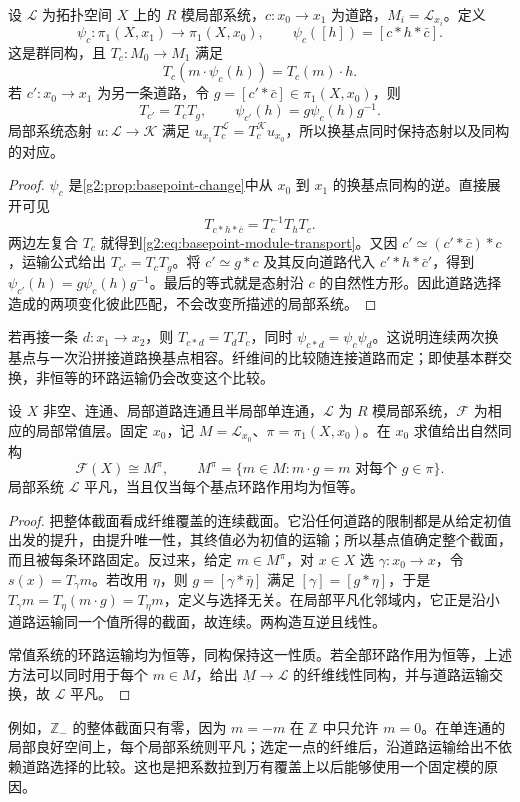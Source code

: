 \begin{proposition}\label{g2:prop:basepoint-local-system}
	设 \(\mathcal L\) 为拓扑空间 \(X\) 上的 \(R\) 模局部系统，\(c:x_0\to x_1\) 为道路，\(M_i=\mathcal L_{x_i}\)。定义
	\[
		\psi_c:\pi_1(X,x_1)\longrightarrow\pi_1(X,x_0),\qquad
		\psi_c([h])=[c*h*\bar c].
	\]
	这是群同构，且 \(T_c:M_0\to M_1\) 满足
	\begin{equation}\label{g2:eq:basepoint-module-transport}
		T_c(m\cdot\psi_c(h))=T_c(m)\cdot h.
	\end{equation}
	若 \(c':x_0\to x_1\) 为另一条道路，令 \(g=[c'*\bar c]\in\pi_1(X,x_0)\)，则
	\[
		T_{c'}=T_cT_g,\qquad\psi_{c'}(h)=g\psi_c(h)g^{-1}.
	\]
	局部系统态射 \(u:\mathcal L\to\mathcal K\) 满足 \(u_{x_1}T_c^{\mathcal L}=T_c^{\mathcal K}u_{x_0}\)，所以换基点同时保持态射以及同构的对应。
\end{proposition}
\begin{proof}
	\(\psi_c\) 是\cref{g2:prop:basepoint-change}中从 \(x_0\) 到 \(x_1\) 的换基点同构的逆。直接展开可见
	\[
		T_{c*h*\bar c}=T_c^{-1}T_hT_c.
	\]
	两边左复合 \(T_c\) 就得到\eqref{g2:eq:basepoint-module-transport}。又因 \(c'\simeq(c'*\bar c)*c\)，运输公式给出 \(T_{c'}=T_cT_g\)。将 \(c'\simeq g*c\) 及其反向道路代入 \(c'*h*\bar c'\)，得到 \(\psi_{c'}(h)=g\psi_c(h)g^{-1}\)。最后的等式就是态射沿 \(c\) 的自然性方形。因此道路选择造成的两项变化彼此匹配，不会改变所描述的局部系统。
\end{proof}

若再接一条 \(d:x_1\to x_2\)，则 \(T_{c*d}=T_dT_c\)，同时 \(\psi_{c*d}=\psi_c\psi_d\)。这说明连续两次换基点与一次沿拼接道路换基点相容。纤维间的比较随连接道路而定；即使基本群交换，非恒等的环路运输仍会改变这个比较。

\begin{proposition}\label{g2:prop:parallel-sections}
	设 \(X\) 非空、连通、局部道路连通且半局部单连通，\(\mathcal L\) 为 \(R\) 模局部系统，\(\mathscr F\) 为相应的局部常值层。固定 \(x_0\)，记 \(M=\mathcal L_{x_0}\)、\(\pi=\pi_1(X,x_0)\)。在 \(x_0\) 求值给出自然同构
	\[
		\mathscr F(X)\cong M^\pi,
		\qquad M^\pi=\{m\in M:m\cdot g=m\text{ 对每个 }g\in\pi\}.
	\]
	局部系统 \(\mathcal L\) 平凡，当且仅当每个基点环路作用均为恒等。
\end{proposition}
\begin{proof}
	把整体截面看成纤维覆盖的连续截面。它沿任何道路的限制都是从给定初值出发的提升，由提升唯一性，其终值必为初值的运输；所以基点值确定整个截面，而且被每条环路固定。反过来，给定 \(m\in M^\pi\)，对 \(x\in X\) 选 \(\gamma:x_0\to x\)，令 \(s(x)=T_\gamma m\)。若改用 \(\eta\)，则 \(g=[\gamma*\bar\eta]\) 满足 \([\gamma]=[g*\eta]\)，于是 \(T_\gamma m=T_\eta(m\cdot g)=T_\eta m\)，定义与选择无关。在局部平凡化邻域内，它正是沿小道路运输同一个值所得的截面，故连续。两构造互逆且线性。

	常值系统的环路运输均为恒等，同构保持这一性质。若全部环路作用为恒等，上述方法可以同时用于每个 \(m\in M\)，给出 \(\underline M\to\mathcal L\) 的纤维线性同构，并与道路运输交换，故 \(\mathcal L\) 平凡。
\end{proof}

例如，\(\mathbb Z_-\) 的整体截面只有零，因为 \(m=-m\) 在 \(\mathbb Z\) 中只允许 \(m=0\)。在单连通的局部良好空间上，每个局部系统则平凡；选定一点的纤维后，沿道路运输给出不依赖道路选择的比较。这也是把系数拉到万有覆盖上以后能够使用一个固定模的原因。
